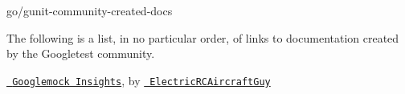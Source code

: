 go/gunit-\/community-\/created-\/docs

The following is a list, in no particular order, of links to documentation created by the Googletest community.


\begin{DoxyItemize}
\item \href{https://github.com/ElectricRCAircraftGuy/eRCaGuy_dotfiles/blob/master/googletest/insights.md}{\texttt{ Googlemock Insights}}, by \href{https://github.com/ElectricRCAircraftGuy}{\texttt{ Electric\+RCAircraft\+Guy}} 
\end{DoxyItemize}